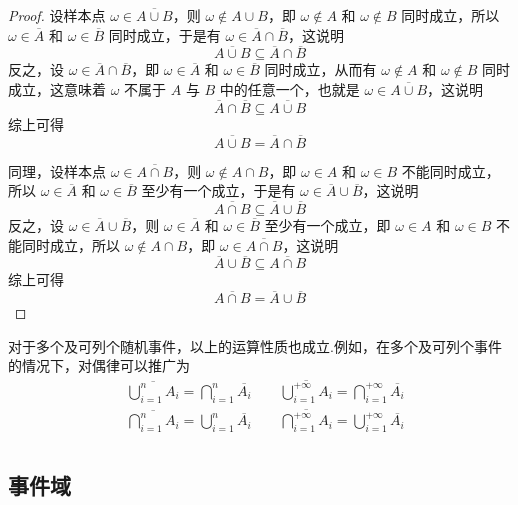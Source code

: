 \begin{proof}
    设样本点 $\omega \in \overline{A \cup B}$，则 $\omega \notin A \cup B$，即 $\omega \notin A$ 和 $\omega \notin B$ 同时成立，所以 $\omega \in \overline{A}$ 和 $\omega \in \overline{B}$ 同时成立，于是有 $\omega \in \overline{A} \cap \overline{B}$，这说明
    $$
    \overline{A \cup B} \subseteq \overline{A} \cap \overline{B}
    $$
    反之，设 $\omega \in \overline{A} \cap \overline{B}$，即 $\omega \in \overline{A}$ 和 $\omega \in \overline{B}$ 同时成立，从而有 $\omega \notin A$ 和 $\omega \notin B$ 同时成立，这意味着 $\omega$ 不属于 $A$ 与 $B$ 中的任意一个，也就是 $\omega \in \overline{A \cup B}$，这说明
    $$
    \overline{A} \cap \overline{B} \subseteq \overline{A \cup B}
    $$
    综上可得
    $$
    \overline{A \cup B} = \overline{A} \cap \overline{B}
    $$

    同理，设样本点 $\omega \in \overline{A \cap B}$，则 $\omega \notin A \cap B$，即 $\omega \in A$ 和 $\omega \in B$ 不能同时成立，所以 $\omega \in \overline{A}$ 和 $\omega \in \overline{B}$ 至少有一个成立，于是有 $\omega \in \overline{A} \cup \overline{B}$，这说明
    $$
    \overline{A \cap B} \subseteq \overline{A} \cup \overline{B}
    $$
    反之，设 $\omega \in \overline{A} \cup \overline{B}$，则 $\omega \in \overline{A}$ 和 $\omega \in \overline{B}$ 至少有一个成立，即 $\omega \in A$ 和 $\omega \in B$ 不能同时成立，所以 $\omega \notin A \cap B$，即 $\omega \in \overline{A \cap B}$，这说明
    $$
    \overline{A} \cup \overline{B} \subseteq \overline{A \cap B}
    $$
    综上可得
    $$
    \overline{A \cap B} = \overline{A} \cup \overline{B}
    $$
\end{proof}

对于多个及可列个随机事件，以上的运算性质也成立.例如，在多个及可列个事件的情况下，对偶律可以推广为
$$
\begin{aligned}
    & \overline{\bigcup_{i=1}^n A_i} = \bigcap_{i=1}^n \overline{A_i} \qquad \overline{\bigcup_{i=1}^{+\infty} A_i} = \bigcap_{i=1}^{+\infty} \overline{A_i} \\
    & \overline{\bigcap_{i=1}^n A_i} = \bigcup_{i=1}^n \overline{A_i} \qquad \overline{\bigcap_{i=1}^{+\infty} A_i} = \bigcup_{i=1}^{+\infty} \overline{A_i} \\
\end{aligned}
$$

\subsection{事件域}

